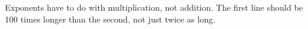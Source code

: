 Exponents have to do with multiplication, not addition. The
first line should be 100 times longer than the second,
not just twice as long.



